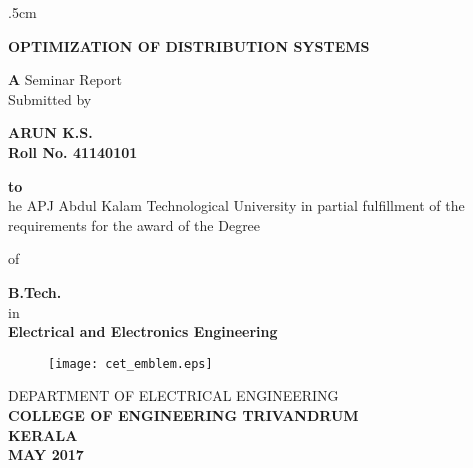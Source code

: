 \documentclass[a4paper,12pt,oneside]{report}%
\begin{document}
\thispagestyle{empty}

\oddsidemargin 1.48cm
\evensidemargin .5cm
\begin{center}

{\Large \bf OPTIMIZATION OF  DISTRIBUTION SYSTEMS \\}

\vspace*{0.75cm}
{\large \textbf A Seminar Report}\\

Submitted by

\vspace*{.25cm}

{\bf ARUN K.S.}\\
{\bf Roll No. 41140101}
\vspace*{0.75cm}

{\bf to}\\
{\normalsize he APJ Abdul Kalam Technological University
in partial fulfillment of the requirements for the award of  the Degree }

{of}\\
\vspace*{1cm}

{\bf B.Tech.}\\
\vspace*{1.5mm}
in\\
\vspace*{1.5mm}
{\bf Electrical and Electronics Engineering}\\
\vspace*{.75cm}






\begin{figure}[hbt]
\centering
\centerline{\texttt{[image: cet\_emblem.eps]}}
\end{figure}

\vspace*{0.75cm}


{\footnotesize DEPARTMENT OF ELECTRICAL ENGINEERING}\\
{\small \bf COLLEGE OF ENGINEERING TRIVANDRUM}\\
{\small \bf KERALA\\
MAY 2017}
\end{center}
%
\newpage
{}
\thispagestyle{empty}
\end{document}
